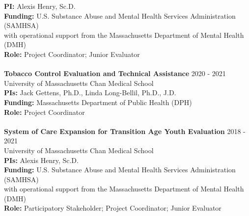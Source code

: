 \documentclass[a4paper,12pt]{article}
\begin{document}
{\textbf{PI:} Alexis Henry, Sc.D.\\
\textbf{Funding:} U.S. Substance Abuse and Mental Health Services Administration (SAMHSA) \\with operational support from the Massachusetts Department of Mental Health (DMH)\\
\textbf{Role:} Project Coordinator; Junior Evaluator\\
\\
\textbf{Tobacco Control Evaluation and Technical Assistance} \hfill 2020 - 2021\\
University of Massachusetts Chan Medical School\\
\textbf{PIs:} Jack Gettens, Ph.D., Linda Long-Bellil, Ph.D., J.D.\\
\textbf{Funding:} Massachusetts Department of Public Health (DPH)\\
\textbf{Role:} Project Coordinator\\
\\
\textbf{System of Care Expansion for Transition Age Youth Evaluation} \hfill 2018 - 2021\\
University of Massachusetts Chan Medical School\\
\textbf{PIs:} Alexis Henry, Sc.D.\\
\textbf{Funding:} U.S. Substance Abuse and Mental Health Services Administration (SAMHSA) \\with operational support from the Massachusetts Department of Mental Health (DMH)\\
\textbf{Role:}  Participatory Stakeholder; Project Coordinator; Junior Evaluator\\
}
\end{document}
